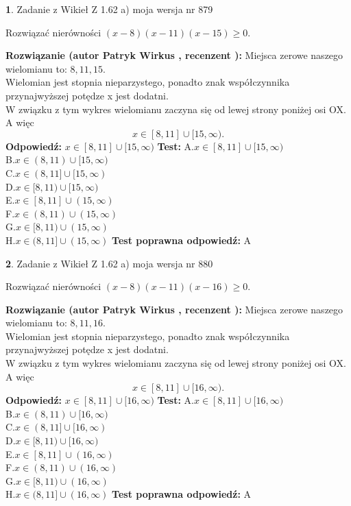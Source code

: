 \documentclass[12pt, a4paper]{article}
\theoremstyle{definition} %
\newtheorem{zad}{}
\newcommand{\zadStart}[1]{\begin{zad}#1\newline}
\newcommand{\zadStop}{\end{zad}}
\newcommand{\rozwStart}[2]{\noindent \textbf{Rozwiązanie (autor #1 , recenzent #2): }\newline}
\newcommand{\rozwStop}{\newline}
\newcommand{\odpStart}{\noindent \textbf{Odpowiedź:}\newline}
\newcommand{\odpStop}{\newline}
\newcommand{\testStart}{\noindent \textbf{Test:}\newline}
\newcommand{\testStop}{\newline}
\newcommand{\kluczStart}{\noindent \textbf{Test poprawna odpowiedź:}\newline}
\newcommand{\kluczStop}{\newline}
\begin{document}
\zadStart{Zadanie z Wikieł Z 1.62 a) moja wersja nr 879}

Rozwiązać nierówności $(x-8)(x-11)(x-15)\ge0$.
\zadStop
\rozwStart{Patryk Wirkus}{}
Miejsca zerowe naszego wielomianu to: $8, 11, 15$.\\
Wielomian jest stopnia nieparzystego, ponadto znak współczynnika przy\linebreak najwyższej potędze x jest dodatni.\\ W związku z tym wykres wielomianu zaczyna się od lewej strony poniżej osi OX. A więc $$x \in [8,11] \cup [15,\infty).$$
\rozwStop
\odpStart
$x \in [8,11] \cup [15,\infty)$
\odpStop
\testStart
A.$x \in [8,11] \cup [15,\infty)$\\
B.$x \in (8,11) \cup [15,\infty)$\\
C.$x \in (8,11] \cup [15,\infty)$\\
D.$x \in [8,11) \cup [15,\infty)$\\
E.$x \in [8,11] \cup (15,\infty)$\\
F.$x \in (8,11) \cup (15,\infty)$\\
G.$x \in [8,11) \cup (15,\infty)$\\
H.$x \in (8,11] \cup (15,\infty)$
\testStop
\kluczStart
A
\kluczStop



\zadStart{Zadanie z Wikieł Z 1.62 a) moja wersja nr 880}

Rozwiązać nierówności $(x-8)(x-11)(x-16)\ge0$.
\zadStop
\rozwStart{Patryk Wirkus}{}
Miejsca zerowe naszego wielomianu to: $8, 11, 16$.\\
Wielomian jest stopnia nieparzystego, ponadto znak współczynnika przy\linebreak najwyższej potędze x jest dodatni.\\ W związku z tym wykres wielomianu zaczyna się od lewej strony poniżej osi OX. A więc $$x \in [8,11] \cup [16,\infty).$$
\rozwStop
\odpStart
$x \in [8,11] \cup [16,\infty)$
\odpStop
\testStart
A.$x \in [8,11] \cup [16,\infty)$\\
B.$x \in (8,11) \cup [16,\infty)$\\
C.$x \in (8,11] \cup [16,\infty)$\\
D.$x \in [8,11) \cup [16,\infty)$\\
E.$x \in [8,11] \cup (16,\infty)$\\
F.$x \in (8,11) \cup (16,\infty)$\\
G.$x \in [8,11) \cup (16,\infty)$\\
H.$x \in (8,11] \cup (16,\infty)$
\testStop
\kluczStart
A
\kluczStop
\end{document}
